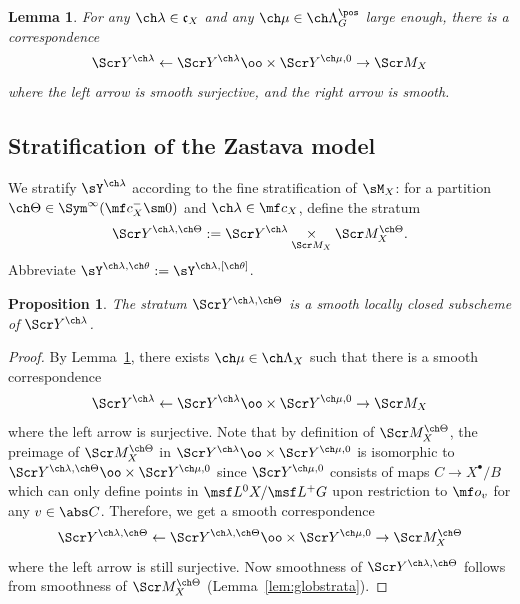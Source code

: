 \documentclass[final]{amsart}
\newtheorem{lem}[subsubsection]{Lemma}
\newtheorem{prop}[subsubsection]{Proposition}
\theoremstyle{remark}
\theoremstyle{definition}
\numberwithin{equation}{section}
\begin{document}
\begin{lem} \label{lem:localglobalyoga}
For any $\ch\lambda\in \mathfrak c_X$ and any $\ch\mu \in \ch\Lambda_G^\pos$ large enough, there is a correspondence 
\[ 
\Scr Y^{\ch\lambda} \leftarrow 
\Scr Y^{\ch\lambda} \oo\times \Scr Y^{\ch\mu,0} \rightarrow 
\Scr M_{X} 
\]
where the left arrow is smooth surjective, and the right arrow is smooth.
\end{lem}



\subsection{Stratification of the Zastava model}
We stratify $\sY^{\ch\lambda}$ according to the fine stratification of $\sM_X$:
for a partition $\ch\Theta \in \Sym^\infty(\mf c_X^- \sm 0)$
and $\ch\lambda\in \mf c_X$,
define the stratum 
\[ \Scr Y^{\ch\lambda,\ch\Theta} := \Scr Y^{\ch\lambda}
\underset{\Scr M_X}\times \Scr M_X^{\ch\Theta}. \]
Abbreviate $\sY^{\ch\lambda,\ch\theta} := \sY^{\ch\lambda,[\ch\theta]}$.

\begin{prop} \label{prop:localstrata}
The stratum $\Scr Y^{\ch\lambda,\ch\Theta}$ is a smooth locally closed
subscheme of $\Scr Y^{\ch\lambda}$.
\end{prop}
\begin{proof}
By Lemma~\ref{lem:localglobalyoga}, there exists $\ch\mu\in\ch\Lambda_X$
such that there is a smooth correspondence 
\[ \Scr Y^{\ch\lambda} \leftarrow \Scr Y^{\ch\lambda}\oo\times \Scr Y^{\ch\mu,0} \to \Scr M_X \]
where the left arrow is surjective.
Note that by definition of $\Scr M_X^{\ch\Theta}$, the preimage of 
$\Scr M_X^{\ch\Theta}$ in $\Scr Y^{\ch\lambda}\oo\times\Scr Y^{\ch\mu,0}$
is isomorphic to $\Scr Y^{\ch\lambda,\ch\Theta} \oo\times \Scr Y^{\ch\mu,0}$
since $\Scr Y^{\ch\mu,0}$ consists
of maps $C\to X^\bullet/B$ which can only define points in $\msf L^0 X/\msf L^+ G$ 
upon restriction to $\mf o_v$ for any $v\in \abs C$.
Therefore, we get a smooth correspondence
\begin{equation} \label{e:localglobalcorresp}
    \Scr Y^{\ch\lambda,\ch\Theta} \leftarrow \Scr Y^{\ch\lambda,\ch\Theta} \oo\times \Scr Y^{\ch\mu,0} \to \Scr M_X^{\ch\Theta} 
\end{equation}
where the left arrow is still surjective. 
Now smoothness of $\Scr Y^{\ch\lambda,\ch\Theta}$ follows from smoothness
of $\Scr M_X^{\ch\Theta}$ (Lemma~\ref{lem:globstrata}).
\end{proof}
\end{document}
